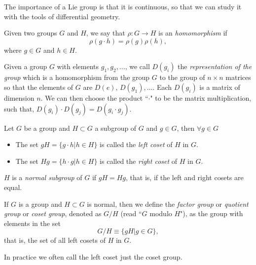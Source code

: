 The importance of a Lie group is that it is continuous, so that we can study it with the tools of differential geometry.

\begin{definition}[Homomorphism] Given two groups $G$ and $H$, we say that $\rho: G \to H$ is an \textit{homomorphism} if
\begin{equation}
	\rho(g\cdot h) = \rho(g)\rho(h),
\end{equation}
where $g\in G$ and $h\in H$.
\end{definition}

\begin{definition}
Given a group $G$ with elements $g_1, g_2, \dots$, we call $D(g_i)$ the \textit{representation of the group} which is a homomorphism from the group $G$ to the group of $n\times n$ matrices so that the elements of $G$ are $D(e), \, D(g_1),\dots$. Each $D(g_i)$ is a matrix of dimension $n$. We can then choose the product ``$\cdot$" to be the matrix multiplication, such that, $D(g_i)\cdot D(g_j) = D(g_i\cdot g_j)$.
\end{definition}
\begin{definition}
Let $G$ be a group and $H\subset G$ a subgroup of $G$ and $g\in G$, then $\forall g \in G$
 \begin{itemize}
 \item The set $gH = \{g\cdot h| h\in H\}$ is called the \textit{left coset} of $H$ in $G$.
 \item The set $Hg = \{h\cdot g| h\in H\}$ is called the \textit{right coset} of $H$ in $G$.
 \end{itemize}
\end{definition}

\begin{definition}
$H$ is a \textit{normal subgroup} of $G$ if $gH = Hg$, that is, if the left and right cosets are equal.
\end{definition}

\begin{definition}
If $G$ is a group and $H\subset G$ is normal, then we define the \textit{factor group} or \textit{quotient group} or \textit{coset group}, denoted as $G/H$ (read ``$G$ modulo $H$"), as the group with elements in the set
\begin{equation}
	G/H \equiv \{gH|g\in G\},
\end{equation} 
that is, the set of all left cosets of $H$ in $G$.
\end{definition}
In practice we often call the left coset just the coset group. 

